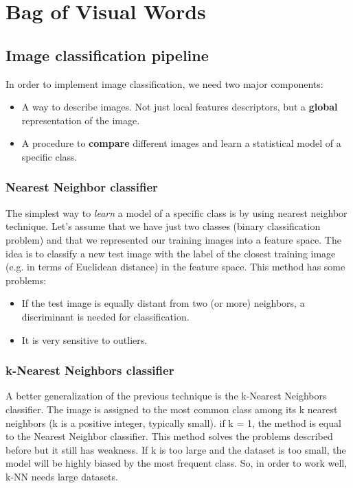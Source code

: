 \chapter{Bag of Visual Words}
\section{Image classification pipeline}
In order to implement image classification, we need two major components:
\begin{itemize}
    \item A way to describe images. Not just local features descriptors, but a \textbf{global} representation of the image.
    \item A procedure to \textbf{compare} different images and learn a statistical model of a specific class. 
\end{itemize}

\subsection{Nearest Neighbor classifier}
The simplest way to \textit{learn} a model of a specific class is by using nearest neighbor technique.\newline\newline
Let's assume that we have just two classes (binary classification problem) and that we represented our training images into a feature space. The idea is to classify a new test image with the label of the closest training image (e.g. in terms of Euclidean distance) in the feature space.\newline\newline
This method has some problems:
\begin{itemize}
    \item If the test image is equally distant from two (or more) neighbors, a discriminant is needed for classification.
    \item It is very sensitive to outliers.
\end{itemize}
\subsection{k-Nearest Neighbors classifier}
A better generalization of the previous technique is the k-Nearest Neighbors classifier.\newline\newline
The image is assigned to the most common class among its k nearest neighbors (k is a positive integer, typically small). if k = 1, the method is equal to the Nearest Neighbor classifier.\newline\newline
This method solves the problems described before but it still has weakness. If k is too large and the dataset is too small, the model will be highly biased by the most frequent class. So, in order to work well, k-NN needs large datasets.
